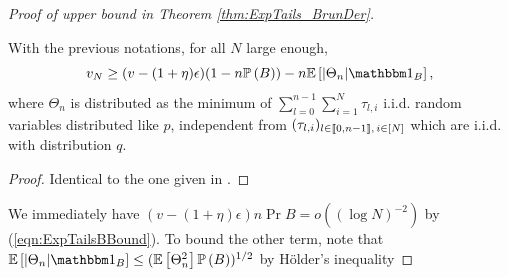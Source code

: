 \begin{proof}[Proof of upper bound in Theorem \ref{thm:ExpTails_BrunDer}]
\begin{lemma}
With the previous notations, for all $N$ large enough, 
\begin{equation}
v_N \geq (v - (1 + \eta)\epsilon)(1 - n \Pr{B}) - n \Ex{|\Theta_n| \Ind_B}, 
\end{equation}
where $\Theta_n$ is distributed as the minimum of $\sum_{l = 0}^{n-1} \sum_{i=1}^N \tau_{l, i}$ i.i.d. random variables distributed like $p$, independent from $(\tau_{l,i})_{l \in \llbracket0, n-1\rrbracket,\, i \in [N]}$ which are i.i.d. with distribution $q$. 
\end{lemma}
\begin{proof}
Identical to the one given in \cite{exp_tails}. 
\end{proof}
We immediately have $(v - (1 + \eta)\epsilon) n \Pr{B} = o((\log N)^{-2})$ by (\ref{eqn:ExpTailsBBound}). To bound the other term, note that $\Ex{|\Theta_n| \Ind_B} \leq (\Ex{\Theta_n^2}\Pr{B})^{1/2}$ by Hölder's inequality

\end{proof}